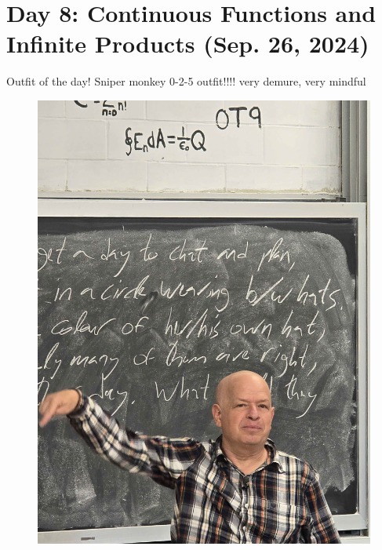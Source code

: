 \section{Day 8: Continuous Functions and Infinite Products (Sep. 26, 2024)}
Outfit of the day! Sniper monkey 0-2-5 outfit!!!! very demure, very mindful
\begin{figure}[h]
    \centering
    \includegraphics[scale=0.1]{MAT327 Notes/Dror Shirts/dror day 8 shirt.jpg}
\end{figure}

